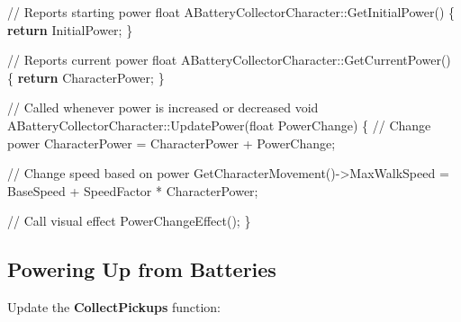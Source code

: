 \documentclass[
  letterpaper,
  DIV=11,
  numbers=noendperiod]{scrartcl}
\newenvironment{Shaded}{\begin{snugshade}}{\end{snugshade}}
\newcommand{\CommentTok}[1]{\textcolor[rgb]{0.37,0.37,0.37}{#1}}
\newcommand{\ControlFlowTok}[1]{\textcolor[rgb]{0.00,0.23,0.31}{\textbf{#1}}}
\newcommand{\DataTypeTok}[1]{\textcolor[rgb]{0.68,0.00,0.00}{#1}}
\newcommand{\NormalTok}[1]{\textcolor[rgb]{0.00,0.23,0.31}{#1}}
\newcommand{\OperatorTok}[1]{\textcolor[rgb]{0.37,0.37,0.37}{#1}}
\begin{document}
\begin{Shaded}
\begin{Highlighting}[]
\CommentTok{// Reports starting power}
\DataTypeTok{float}\NormalTok{ ABatteryCollectorCharacter}\OperatorTok{::}\NormalTok{GetInitialPower}\OperatorTok{()}
\OperatorTok{\{}
    \ControlFlowTok{return}\NormalTok{ InitialPower}\OperatorTok{;}
\OperatorTok{\}}

\CommentTok{// Reports current power}
\DataTypeTok{float}\NormalTok{ ABatteryCollectorCharacter}\OperatorTok{::}\NormalTok{GetCurrentPower}\OperatorTok{()}
\OperatorTok{\{}
    \ControlFlowTok{return}\NormalTok{ CharacterPower}\OperatorTok{;}
\OperatorTok{\}}

\CommentTok{// Called whenever power is increased or decreased}
\DataTypeTok{void}\NormalTok{ ABatteryCollectorCharacter}\OperatorTok{::}\NormalTok{UpdatePower}\OperatorTok{(}\DataTypeTok{float}\NormalTok{ PowerChange}\OperatorTok{)}
\OperatorTok{\{}
    \CommentTok{// Change power}
\NormalTok{    CharacterPower }\OperatorTok{=}\NormalTok{ CharacterPower }\OperatorTok{+}\NormalTok{ PowerChange}\OperatorTok{;}
    
    \CommentTok{// Change speed based on power}
\NormalTok{    GetCharacterMovement}\OperatorTok{(){-}\textgreater{}}\NormalTok{MaxWalkSpeed }\OperatorTok{=}\NormalTok{ BaseSpeed }\OperatorTok{+}\NormalTok{ SpeedFactor }\OperatorTok{*}\NormalTok{ CharacterPower}\OperatorTok{;}
    
    \CommentTok{// Call visual effect}
\NormalTok{    PowerChangeEffect}\OperatorTok{();}
\OperatorTok{\}}
\end{Highlighting}
\end{Shaded}

\subsection{Powering Up from
Batteries}\label{powering-up-from-batteries}

Update the \textbf{CollectPickups} function:
\end{document}

